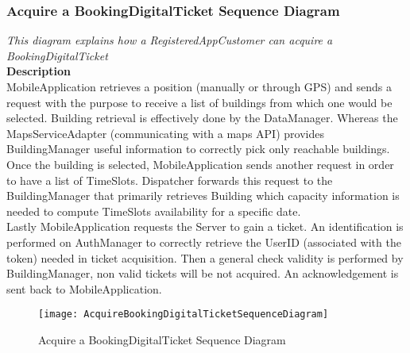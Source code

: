 \subsubsection{Acquire a BookingDigitalTicket Sequence Diagram}
\textit{This diagram explains how a RegisteredAppCustomer can acquire a BookingDigitalTicket\\}
\textbf{Description\\}
MobileApplication retrieves a position (manually or through GPS) and sends a request with the purpose to receive a list of buildings from which one would be selected.
Building retrieval is effectively done by the DataManager. Whereas the MapsServiceAdapter (communicating with a maps API) provides BuildingManager useful information to correctly pick only reachable buildings.\\
Once the building is selected, MobileApplication sends another request in order to have a list of TimeSlots. Dispatcher forwards this request to the BuildingManager that primarily retrieves Building which capacity information is needed to compute TimeSlots availability for a specific date.\\
Lastly MobileApplication requests the Server to gain a ticket. An identification is performed on AuthManager to correctly retrieve the UserID (associated with the token) needed in ticket acquisition. Then a general check validity is performed by BuildingManager, non valid tickets will be not acquired. An acknowledgement is sent back to MobileApplication.

\begin{figure}[H]
 \centering
 \texttt{[image: AcquireBookingDigitalTicketSequenceDiagram]}
 \caption{ Acquire a BookingDigitalTicket Sequence Diagram}
 \end{figure}

\newpage
